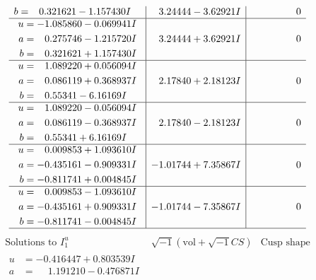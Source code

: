 \documentclass[1p]{elsarticle_modified}
\theoremstyle{definition}
\newcommand{\I}{\sqrt{-1}}
\begin{document}
$$\begin{array}{c|c|c}
\begin{aligned}
b &= \phantom{-}0.321621 - 1.157430 I\end{aligned}
 & \phantom{-}3.24444 - 3.62921 I & \phantom{-0.000000 } 0 \\ \hline\begin{aligned}
u &= -1.085860 - 0.069941 I \\
a &= \phantom{-}0.275746 - 1.215720 I \\
b &= \phantom{-}0.321621 + 1.157430 I\end{aligned}
 & \phantom{-}3.24444 + 3.62921 I & \phantom{-0.000000 } 0 \\ \hline\begin{aligned}
u &= \phantom{-}1.089220 + 0.056094 I \\
a &= \phantom{-}0.086119 + 0.368937 I \\
b &= \phantom{-}0.55341 - 6.16169 I\end{aligned}
 & \phantom{-}2.17840 + 2.18123 I & \phantom{-0.000000 } 0 \\ \hline\begin{aligned}
u &= \phantom{-}1.089220 - 0.056094 I \\
a &= \phantom{-}0.086119 - 0.368937 I \\
b &= \phantom{-}0.55341 + 6.16169 I\end{aligned}
 & \phantom{-}2.17840 - 2.18123 I & \phantom{-0.000000 } 0 \\ \hline\begin{aligned}
u &= \phantom{-}0.009853 + 1.093610 I \\
a &= -0.435161 - 0.909331 I \\
b &= -0.811741 + 0.004845 I\end{aligned}
 & -1.01744 + 7.35867 I & \phantom{-0.000000 } 0 \\ \hline\begin{aligned}
u &= \phantom{-}0.009853 - 1.093610 I \\
a &= -0.435161 + 0.909331 I \\
b &= -0.811741 - 0.004845 I\end{aligned}
 & -1.01744 - 7.35867 I & \phantom{-0.000000 } 0\\
 \hline 
 \end{array}$$\newpage$$\begin{array}{c|c|c}  
\text{Solutions to }I^u_{1}& \I (\text{vol} + \sqrt{-1}CS) & \text{Cusp shape}\\
 \hline 
\begin{aligned}
u &= -0.416447 + 0.803539 I \\
a &= \phantom{-}1.191210 - 0.476871 I \\

\end{aligned}
\end{array}$$
\end{document}
